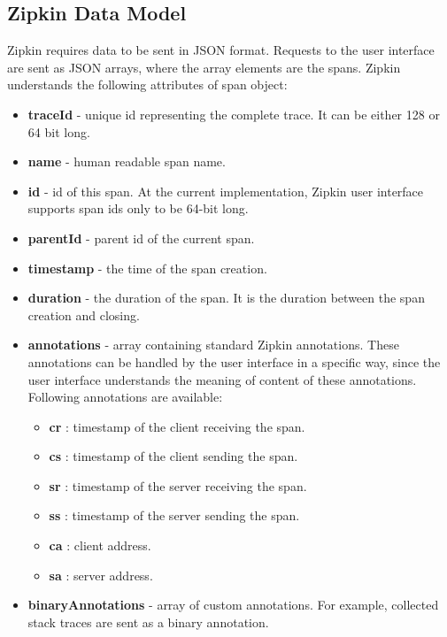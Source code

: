 \subsection{Zipkin Data Model}
Zipkin requires data to be sent in JSON format. Requests to the user interface are sent as JSON arrays, where the array elements are the spans. Zipkin understands the following attributes of span object:
\begin{itemize}
	\item \textbf{traceId} - unique id representing the complete trace. It can be either 128 or 64 bit long.
	\item \textbf{name} - human readable span name.
	\item \textbf{id} - id of this span. At the current implementation, Zipkin user interface supports span ids only to be 64-bit long.
	\item \textbf{parentId} - parent id of the current span.
	\item \textbf{timestamp} - the time of the span creation.
	\item \textbf{duration} - the duration of the span. It is the duration between the span creation and closing.
	\item \textbf{annotations} - array containing standard Zipkin annotations. These annotations can be handled by the user interface in a specific way, since the user interface understands the meaning of content of these annotations. Following annotations are available:
	\begin{itemize}
		\item \textbf{cr} : timestamp of the client receiving the span.
		\item \textbf{cs} : timestamp of the client sending the span.
		\item \textbf{sr} : timestamp of the server receiving the span.
		\item \textbf{ss} : timestamp of the server sending the span.
		\item \textbf{ca} : client address.
		\item \textbf{sa} : server address.
	\end{itemize}
	\item \textbf{binaryAnnotations} - array of custom annotations. For example, collected stack traces are sent as a binary annotation.
\end{itemize}

